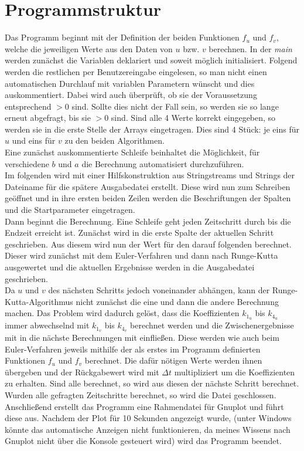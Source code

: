 \documentclass[12pt,a4paper,titlepage,headinclude,bibtotoc]{scrartcl}
\begin{document}
\section{Programmstruktur}
Das Programm beginnt mit der Definition der beiden Funktionen $f_u$ und $f_v$, welche die jeweiligen Werte aus den Daten von $u$ bzw. $v$ berechnen.
In der \emph{main} werden zunächst die Variablen deklariert und soweit möglich initialisiert.
Folgend werden die restlichen per Benutzereingabe eingelesen, so man nicht einen automatischen Durchlauf mit variablen Parametern wünscht und dies auskommentiert.
Dabei wird auch überprüft, ob sie der Voraussetzung entsprechend $>0$ sind.
Sollte dies nicht der Fall sein, so werden sie so lange erneut abgefragt, bis sie $>0$ sind.
Sind alle 4 Werte korrekt eingegeben, so werden sie in die erste Stelle der Arrays eingetragen.
Dies sind 4 Stück: je eins für $u$ und eins für $v$ zu den beiden Algorithmen.\\
Eine zunächst auskommentierte Schleife beinhaltet die Möglichkeit, für verschiedene $b$ und $a$ die Berechnung automatisiert durchzuführen.\\
Im folgenden wird mit einer Hilfskonstruktion aus Stringstreams und Strings der Dateiname für die spätere Ausgabedatei erstellt.
Diese wird nun zum Schreiben geöffnet und in ihre ersten beiden Zeilen werden die Beschriftungen der Spalten und die Startparameter eingetragen.\\
Dann beginnt die Berechnung.
Eine Schleife geht jeden Zeitschritt durch bis die Endzeit erreicht ist.
Zunächst wird in die erste Spalte der aktuellen Schritt geschrieben.
Aus diesem wird nun der Wert für den darauf folgenden berechnet.
Dieser wird zunächst mit dem Euler-Verfahren und dann nach Runge-Kutta ausgewertet und die aktuellen Ergebnisse werden in die Ausgabedatei geschrieben.\\
Da $u$ und $v$ des nächsten Schritts jedoch voneinander abhängen, kann der Runge-Kutta-Algorithmus nicht zunächst die eine und dann die andere Berechnung machen.
Das Problem wird dadurch gelöst, dass die Koeffizienten $k_{1_u}$ bis $k_{4_u}$ immer abwechselnd mit $k_{1_v}$ bis $k_{4_v}$ berechnet werden und die Zwischenergebnisse mit in die nächste Berechnungen mit einfließen.
Diese werden wie auch beim Euler-Verfahren jeweils mithilfe der als erstes im Programm definierten Funktionen $f_u$ und $f_v$ berechnet.
Die dafür nötigen Werte werden ihnen übergeben und der Rückgabewert wird mit $\Delta t$ multipliziert um die Koeffizienten zu erhalten.
Sind alle berechnet, so wird aus diesen der nächste Schritt berechnet.
Wurden alle gefragten Zeitschritte berechnet, so wird die Datei geschlossen.\\
Anschließend erstellt das Programm eine Rahmendatei für Gnuplot und führt diese aus.
Nachdem der Plot für 10 Sekunden angezeigt wurde, (unter Windows könnte das automatische Anzeigen nicht funktionieren, da meines Wissens nach Gnuplot nicht über die Konsole gesteuert wird) wird das Programm beendet.
\end{document}
